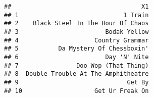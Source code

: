 \documentclass[
]{article}
\begin{document}
\begin{verbatim}
##                                    X1
## 1                             1 Train
## 2    Black Steel In The Hour Of Chaos
## 3                        Bodak Yellow
## 4                     Country Grammar
## 5           Da Mystery Of Chessboxin'
## 6                        Day 'N' Nite
## 7                Doo Wop (That Thing)
## 8  Double Trouble At The Amphitheatre
## 9                              Get By
## 10                    Get Ur Freak On
\end{verbatim}
\end{document}
